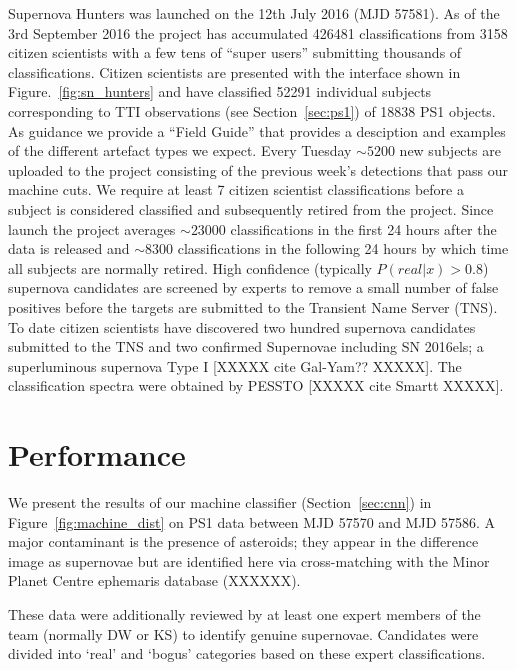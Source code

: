 \documentclass[a4paper,fleqn,usenatbib]{mnras}
\begin{document}
Supernova Hunters was launched on the 12th July 2016 (MJD 57581).  As of the 3rd September 2016 the project has accumulated 426481 classifications from 3158 citizen scientists with a few tens of ``super users'' submitting thousands of classifications.  Citizen scientists are presented with the interface shown in Figure.~\ref{fig:sn_hunters} and have classified 52291 individual subjects corresponding to TTI observations (see Section~\ref{sec:ps1}) of 18838 PS1 objects. As guidance we provide a ``Field Guide'' that provides a desciption and examples of the different artefact types we expect.  Every Tuesday $\sim5200$ new subjects are uploaded to the project consisting of the previous week's detections that pass our machine cuts.  We require at least 7 citizen scientist classifications before a subject is considered classified and subsequently  retired from the project.  Since launch the project averages $\sim23000$ classifications in the first 24 hours after the data is released and $\sim8300$ classifications in the following 24 hours by which time all subjects are normally retired. High confidence (typically $P(real|x)>0.8$) supernova candidates are screened by experts to remove a small number of false positives before the targets are submitted to the Transient Name Server (TNS).  To date citizen scientists have discovered two hundred supernova candidates submitted to the TNS and two confirmed Supernovae including SN 2016els; a superluminous supernova Type I [XXXXX cite Gal-Yam?? XXXXX].  The classification spectra were obtained by PESSTO [XXXXX cite Smartt XXXXX].

\section{Performance}
\label{sec:perform}

We present the results of our machine classifier (Section~\ref{sec:cnn}) in Figure~\ref{fig:machine_dist} on PS1 data between MJD 57570 and MJD 57586. A major contaminant is the presence of asteroids; they appear in the difference image as supernovae but are identified here via cross-matching with the Minor Planet Centre ephemaris database (XXXXXX). 

These data were additionally reviewed by at least one expert members of the team (normally DW or KS) to identify genuine supernovae. Candidates were divided into `real' and `bogus' categories based on these expert classifications. 
\end{document}
